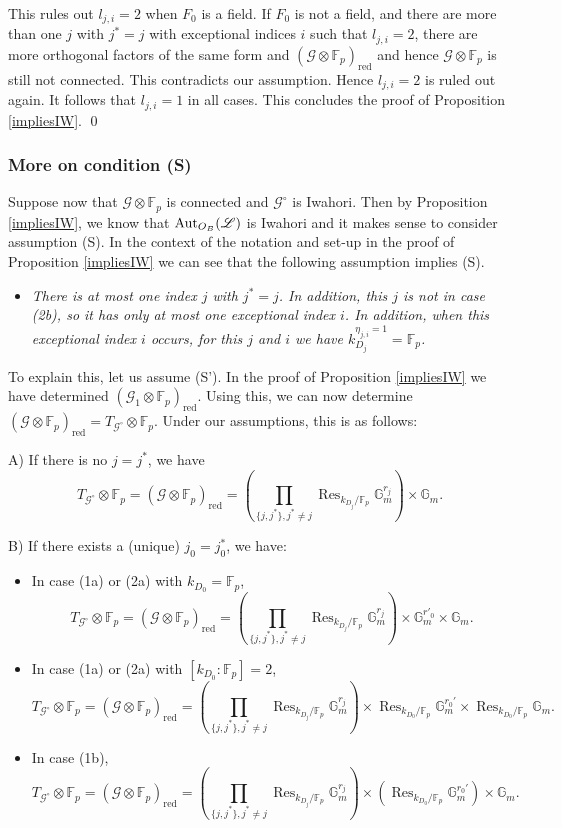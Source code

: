 \documentclass[reqno, 10pt]{amsart}
\newcommand{\BF}{\ensuremath{\mathbb {F}}\xspace}
\newcommand{\BG}{\ensuremath{\mathbb {G}}\xspace}
\newcommand{\CG}{\ensuremath{\mathcal {G}}\xspace}
\newcommand{\red}{\ensuremath{\mathrm{red}}\xspace}
\DeclareMathOperator{\Res}{Res}
\theoremstyle{definition}
\numberwithin{equation}{subsection}
\numberwithin{subsubsection}{subsection}
\begin{document}
This rules out $l_{j,i}=2$ when $F_0$ is a field.  If $F_0$ is not a field, and there are more than one $j$ with $j^*=j$ with exceptional indices $i$ such that $l_{j,i}=2$, there are more orthogonal factors of the same form and 
$(\CG\otimes\BF_p)_{\red}$ and hence $\CG\otimes\BF_p$ is still not connected.  This contradicts our assumption. Hence $l_{j,i}=2$ is ruled out again. 
It follows that $l_{j,i}=1$ in all cases. This concludes the proof of Proposition \ref{impliesIW}. \qed
 

 



\subsubsection{More on condition (S)}\label{sss:Sprime} Suppose now that $\CG\otimes\BF_p$ is connected and $\CG^\circ$ is Iwahori. Then by Proposition \ref{impliesIW}, we know that 
${\rm Aut}_{O_B}(\mathscr L)$ is Iwahori and it makes sense to consider assumption (S). In the context of the notation and set-up in the proof of Proposition \ref{impliesIW} we can see that the following assumption implies (S).
\smallskip

\begin{itemize}
\item[(S')] \emph{There is at most one index $j$ with $j^*=j$. In addition, this $j$ is not in case (2b), so it has only at most one exceptional index $i$.
In addition, when this exceptional index $i$ occurs, for this $j$ and $i$ we have $k_{D_j}^{\eta_{j,i}=1}=\BF_p$.}
\end{itemize}

To explain this, let us assume (S'). In the proof of Proposition \ref{impliesIW} we have determined $(\CG_1\otimes\BF_p)_\red$. Using this, we can now determine
$(\CG\otimes\BF_p)_\red=T_{\CG^\circ}\otimes\BF_p$. Under our assumptions, this is as follows:


 A) If there is no $j=j^*$, we have 
 \[
T_{\CG^\circ}\otimes\BF_p=(\CG\otimes\BF_p)_{\red}=(\prod_{\{j,j^*\}, j^*\neq j} \Res_{k_{D_j}/\BF_p}\BG^{r_j}_m)\times \BG_m.
\]

B) If there exists a (unique) $j_0=j^*_0$, we have:
\begin{itemize}
\item In case (1a) or (2a) with $k_{D_0}=\BF_p$,
\[
T_{\CG^\circ}\otimes\BF_p=(\CG\otimes\BF_p)_{\red} = (\prod_{\{j,j^*\}, j^*\neq j} \Res_{k_{D_j}/\BF_p}\BG^{r_j}_m)\times  \BG_m^{r'_0}\times \BG_m.
\]

\item In case (1a) or (2a) with $[k_{D_0}:\BF_p]=2$,
\[
T_{\CG^\circ}\otimes\BF_p=(\CG\otimes\BF_p)_{\red} = (\prod_{\{j,j^*\}, j^*\neq j} \Res_{k_{D_j}/\BF_p}\BG^{r_j}_m)\times  \Res_{k_{D_0}/\BF_p}\BG^{r_0'}_m\times \Res_{k_{D_0}/\BF_p}\BG_m.
\]

\item In case (1b),
\[
T_{\CG^\circ}\otimes\BF_p=(\CG\otimes\BF_p)_{\red} = (\prod_{\{j,j^*\}, j^*\neq j} \Res_{k_{D_j}/\BF_p}\BG^{r_j}_m)\times  (\Res_{k_{D_0}/\BF_p}\BG^{r_0'}_m)\times\BG_m.
\]
\end{itemize}
\end{document}
